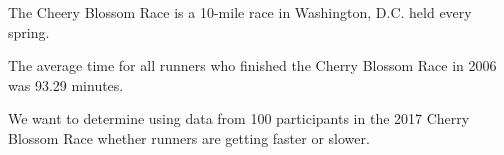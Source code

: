 \documentclass{beamer}
\begin{document}
\begin{frame}
  \begin{example}
    The Cheery Blossom Race is a 10-mile race in Washington, D.C. held every spring.\pause

    \vspace{1mm}
    The average time for all runners who finished the Cherry Blossom Race in 2006 was 93.29 minutes.\pause

    \vspace{1mm}
    We want to determine using data from 100 participants in the 2017 Cherry Blossom Race whether runners are getting faster or slower.\pause

    \vspace{1mm}
    \pause

    \vspace{-4mm}
  \end{example}
\end{frame}
\end{document}
